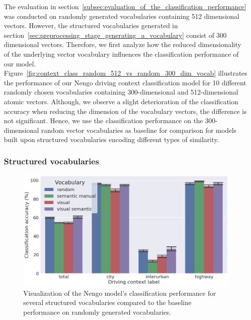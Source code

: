 The evaluation in section~\ref{subsec:evaluation_of_the_classification_performance} was conducted on randomly generated vocabularies containing \num{512} dimensional vectors.
However, the structured vocabularies generated in section~\ref{sec:preprocessing_stage_generating_a_vocabulary} consist of \num{300} dimensional vectors.
Therefore, we first analyze how the reduced dimensionality of the underlying vector vocabulary influences the classification performance of our model.
Figure~\ref{fig:context_class_random_512_vs_random_300_dim_vocab} illustrates the performance of our \ac{Nengo} driving context classification model for \num{10} different randomly chosen vocabularies containing \num{300}-dimensional and \num{512}-dimensional atomic vectors.
Although, we observe a slight deterioration of the classification accuracy when reducing the dimension of the vocabulary vectors, the difference is not significant.
Hence, we use the classification performance on the \num{300}-dimensional random vector vocabularies as baseline for comparison for models built upon structured vocabularies encoding different types of similarity.

\subsubsection{Structured vocabularies}%
\label{ssubsec:structured_vocabularies}

\begin{figure}[t]
    \centering
    \includegraphics[width=0.9\linewidth]{imgs/context_class_vocabularies_tp_and_ts.png}
    \caption{Visualization of the \ac{Nengo} model's classification performance for several structured vocabularies compared to the baseline performance on randomly generated vocabularies.}
    \label{fig:context_class_vocabularies_tp_and_ts}
\end{figure}

